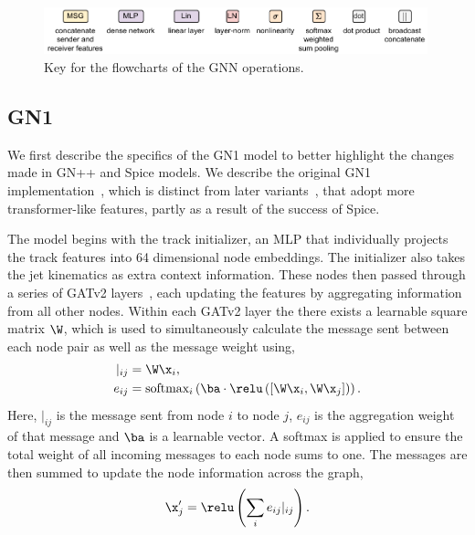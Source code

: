 \begin{figure}[h!]
    \centering
    \includegraphics[width=0.99\textwidth]{figures/flavour_tagging/key.pdf}
    \caption{Key for the flowcharts of the GNN operations.}
    \label{fig:key}
\end{figure}

\subsection{GN1}
\label{sec:gn1}

We first describe the specifics of the GN1 model to better highlight the changes made in GN++ and Spice models.
We describe the original GN1 implementation~\cite{GN1}, which is distinct from later variants~\cite{SamThesis}, that adopt more transformer-like features, partly as a result of the success of Spice.

The model begins with the track initializer, an MLP that individually projects the track features into 64 dimensional node embeddings.
The initializer also takes the jet kinematics as extra context information.
These nodes then passed through a series of GATv2 layers~\cite{GATv2}, each updating the features by aggregating information from all other nodes.
Within each GATv2 layer the there exists a learnable square matrix $\W$, which is used to simultaneously calculate the message sent between each node pair as well as the message weight using,
\begin{align}
    \vert_{ij} &= \W \x_i, \\
 e_{ij} &= \text{softmax}_i\left(\ba \cdot \relu\left([\W \x_i, \W \x_j]\right)\right).
\end{align}
Here, $\vert_{ij}$ is the message sent from node $i$ to node $j$,
$e_{ij}$ is the aggregation weight of that message and $\ba$ is a learnable vector.
A softmax is applied to ensure the total weight of all incoming messages to each node sums to one.
The messages are then summed to update the node information across the graph,
\begin{equation}
    \x_j' = \relu\left(\sum_{i} e_{ij} \vert_{ij}\right).
\end{equation}

